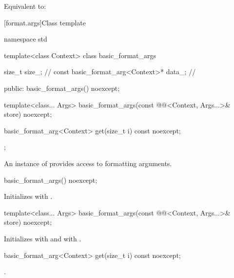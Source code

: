 \begin{itemdescr}
\pnum
\effects
Equivalent to:
\end{itemdescr}

[format.args]{Class template }

\begin{codeblock}
namespace std {
  template<class Context>
  class basic_format_args {
    size_t size_;                               // \expos
    const basic_format_arg<Context>* data_;     // \expos

  public:
    basic_format_args() noexcept;

    template<class... Args>
      basic_format_args(const @@<Context, Args...>& store) noexcept;

    basic_format_arg<Context> get(size_t i) const noexcept;
  };
}
\end{codeblock}

\pnum
An instance of  provides access to formatting
arguments.

%
\begin{itemdecl}
basic_format_args() noexcept;
\end{itemdecl}

\begin{itemdescr}
\pnum
\effects
Initializes  with .
\end{itemdescr}

%
\begin{itemdecl}
template<class... Args>
  basic_format_args(const @@<Context, Args...>& store) noexcept;
\end{itemdecl}

\begin{itemdescr}
\pnum
\effects
Initializes
 with  and
 with .
\end{itemdescr}

%
\begin{itemdecl}
basic_format_arg<Context> get(size_t i) const noexcept;
\end{itemdecl}

\begin{itemdescr}
\pnum
\returns
{}.
\end{itemdescr}

